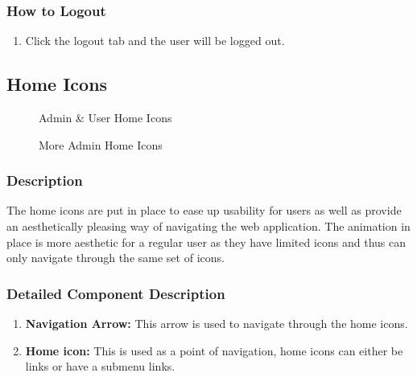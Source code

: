 \documentclass[14pt, a4paper]{article}
\begin{document}
	\subsubsection{How to Logout}
		\begin{enumerate}
			\item Click the logout tab and the user will be logged out.
		\end{enumerate}
\subsection{Home Icons}
	\begin{figure}[H]
		\caption{Admin \& User Home Icons}
		\label{fig:icons1}
	\end{figure}
	\begin{figure}[H]
		\caption{More Admin Home Icons}
		\label{fig:icons2}
	\end{figure}
	\subsubsection{Description} The home icons are put in place to ease up usability for users as well as provide an aesthetically pleasing way of navigating the web application. The animation in place is more aesthetic for a regular user as they have limited icons and thus can only navigate through the same set of icons.
	\subsubsection{Detailed Component Description}
		\begin{enumerate}
			\item \textbf{Navigation Arrow:} This arrow is used to navigate through the home icons.
			\item \textbf{Home icon:} This is used as a point of navigation, home icons can either be links or have a submenu links.
		\end{enumerate}
\end{document}

